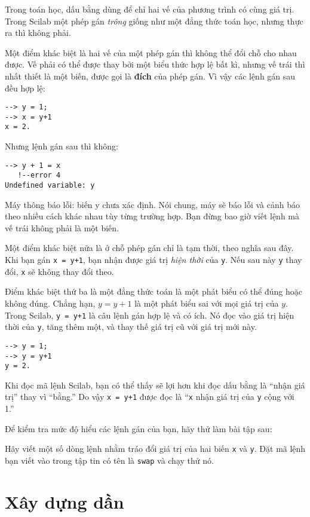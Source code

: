 \documentclass[12pt]{book}
\begin{document}
Trong toán học, dấu bằng dùng để chỉ hai vế của phương trình có
cùng giá trị. Trong Scilab một phép gán {\em trông} giống như một
đẳng thức toán học, nhưng thực ra thì không phải.

Một điểm khác biệt là hai vế của một phép gán thì không thể đổi chỗ
cho nhau được. Vế phải có thể được thay bởi một biểu thức hợp lệ
bất kì, nhưng vế trái thì nhất thiết là một biến, được gọi là 
{\bf đích} của phép gán. Vì vậy các lệnh gán sau đều hợp lệ:

\begin{verbatim}
--> y = 1;
--> x = y+1
x = 2.
\end{verbatim}
%
Nhưng lệnh gán sau thì không:

\begin{verbatim}
--> y + 1 = x
   !--error 4 
Undefined variable: y
\end{verbatim}
%
Máy thông báo lỗi: biến y chưa xác định. Nói chung, máy sẽ báo lỗi
và cảnh báo theo nhiều cách khác nhau tùy từng trường hợp. Bạn 
đừng bao giờ viết lệnh mà vế trái không phải là một biến.

Một điểm khác biệt nữa là ở chỗ phép gán chỉ là tạm thời, theo nghĩa
sau đây. Khi bạn gán {\tt x = y+1}, bạn nhận được giá trị 
{\em hiện thời} của {\tt y}.  Nếu sau này {\tt y} thay đổi, {\tt x}
sẽ không thay đổi theo.

Điểm khác biệt thứ ba là một đẳng thức toán là một phát biểu có thể
đúng hoặc không đúng. Chẳng hạn, $y = y+1$ là một phát biểu
sai với mọi giá trị của $y$.  Trong Scilab, {\tt y = y+1} là câu lệnh gán
hợp lệ và có ích. Nó đọc vào giá trị hiện thời của {\tt y}, tăng thêm một, 
và thay thế giá trị cũ với giá trị mới này.

\begin{verbatim}
--> y = 1;
--> y = y+1
y = 2.
\end{verbatim}
%
Khi đọc mã lệnh Scilab, bạn có thể thấy sẽ lợi hơn khi 
đọc dấu bằng là ``nhận giá trị'' thay vì ``bằng.''  Do vậy {\tt x = y+1}
được đọc là ``{\tt x} nhận giá trị của {\tt y} cộng với 1.''

Để kiểm tra mức độ hiểu các lệnh gán của bạn, hãy thử làm
bài tập sau:

\begin{ex}
Hãy viết một số dòng lệnh nhằm tráo đổi giá trị của hai biến
{\tt x} và {\tt y}. Đặt mã lệnh bạn viết vào trong tập tin có tên 
là {\tt swap} và chạy thử nó.
\end{ex}


\section{Xây dựng dần}
\end{document}
